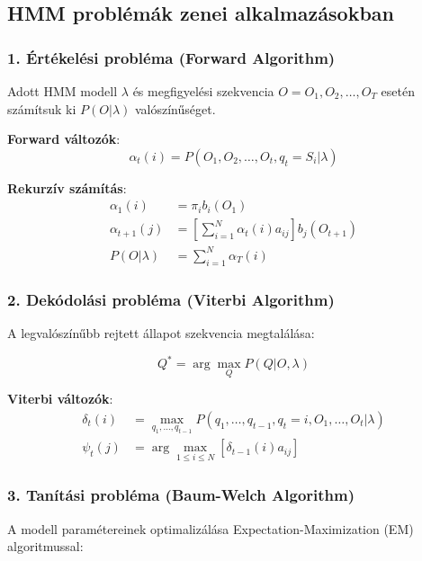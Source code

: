 \subsection{HMM problémák zenei alkalmazásokban}

\subsubsection{1. Értékelési probléma (Forward Algorithm)}

Adott HMM modell $\lambda$ és megfigyelési szekvencia $O = O_1, O_2, \ldots, O_T$ esetén számítsuk ki $P(O|\lambda)$ valószínűséget.

\textbf{Forward változók}:
\begin{equation}
\alpha_t(i) = P(O_1, O_2, \ldots, O_t, q_t = S_i | \lambda)
\end{equation}

\textbf{Rekurzív számítás}:
\begin{align}
\alpha_1(i) &= \pi_i b_i(O_1) \\
\alpha_{t+1}(j) &= \left[\sum_{i=1}^{N} \alpha_t(i) a_{ij}\right] b_j(O_{t+1}) \\
P(O|\lambda) &= \sum_{i=1}^{N} \alpha_T(i)
\end{align}

\subsubsection{2. Dekódolási probléma (Viterbi Algorithm)}

A legvalószínűbb rejtett állapot szekvencia megtalálása:

\begin{equation}
Q^* = \arg\max_Q P(Q|O, \lambda)
\end{equation}

\textbf{Viterbi változók}:
\begin{align}
\delta_t(i) &= \max_{q_1, \ldots, q_{t-1}} P(q_1, \ldots, q_{t-1}, q_t = i, O_1, \ldots, O_t | \lambda) \\
\psi_t(j) &= \arg\max_{1 \leq i \leq N} [\delta_{t-1}(i) a_{ij}]
\end{align}

\subsubsection{3. Tanítási probléma (Baum-Welch Algorithm)}

A modell paramétereinek optimalizálása Expectation-Maximization (EM) algoritmussal:

